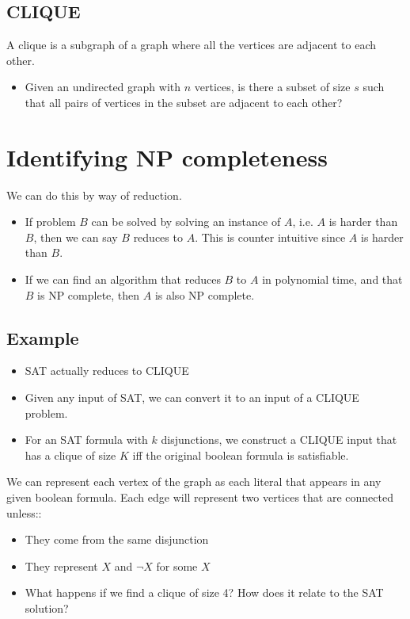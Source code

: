 \documentclass[12pt]{book}
\begin{document}
\subsection*{CLIQUE}

A clique is a subgraph of a graph where all the vertices are adjacent to each other.

\begin{itemize}
    \item Given an undirected graph with $n$ vertices, is there a subset of size $s$ such that all pairs of vertices in the subset are adjacent to each other?
\end{itemize}
\newpage
\section*{Identifying NP completeness}

We can do this by way of reduction.

\begin{itemize}
    \item If problem $B$ can be solved by solving an instance of $A$, i.e. $A$ is harder than $B$, then we can say $B$ reduces to $A$. This is counter intuitive since $A$ is harder than $B$.
    \item If we can find an algorithm that reduces $B$ to $A$ in polynomial time, and that $B$ is NP complete, then $A$ is also NP complete.
\end{itemize}

\subsection*{Example}

\begin{itemize}
    \item SAT actually reduces to CLIQUE
    \item Given any input of SAT, we can convert it to an input of a CLIQUE problem.
    \item For an SAT formula with $k$ disjunctions, we construct a CLIQUE input that has a clique of size $K$ iff the original boolean formula is satisfiable.
\end{itemize}

We can represent each vertex of the graph as each literal that appears in any given boolean formula. Each edge will represent two vertices that are connected unless::

\begin{itemize}
    \item They come from the same disjunction
    \item They represent $X$ and $\lnot X$ for some $X$
    \item What happens if we find a clique of size 4? How does it relate to the SAT solution?
\end{itemize}
\end{document}
